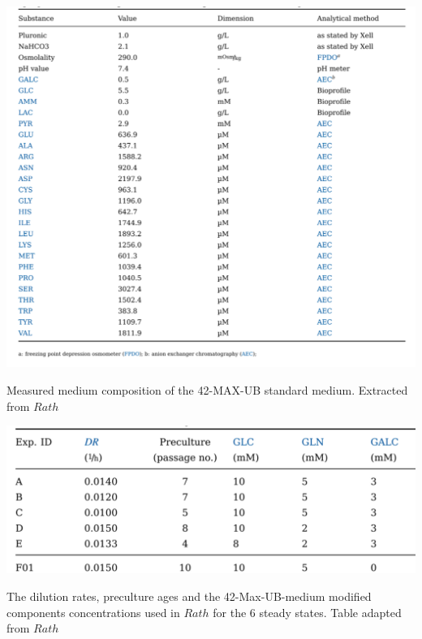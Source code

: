 \documentclass[]{article}
\begin{document}
	 \begin{table}
	 	\centering
	 	\includegraphics[scale = 0.7]{Table_3_1}
	 	\caption{Measured medium composition of the 42-MAX-UB standard medium. Extracted from $Rath$}
	 	
	 \end{table}
	 
	 \begin{table}
	 	\centering
	 	\includegraphics[scale = 0.7]{Table_4_10}
	 	\caption{The dilution rates, preculture ages and the 42-Max-UB-medium modified components concentrations used in $Rath$ for the 6 steady states. Table adapted from $Rath$}
	 	
	 \end{table}
 
\end{document}
